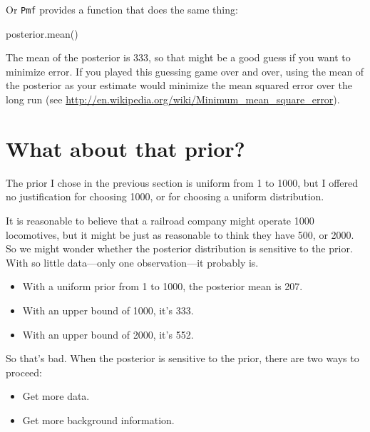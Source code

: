\documentclass[12pt]{book}
\theoremstyle{exercise}
\begin{document}
Or {\tt Pmf} provides a function that does the same thing:

\begin{code}
posterior.mean()
\end{code}

The mean of the posterior is 333, so that might be a good guess if you want to minimize error.  
If you played this guessing game over and over, using the mean of the posterior as your estimate would minimize the mean squared error over the long run (see \url{http://en.wikipedia.org/wiki/Minimum_mean_square_error}).



\section{What about that prior?}

The prior I chose in the previous section is uniform from 1 to 1000, but I offered no justification for choosing 1000, or for choosing a uniform
distribution.


It is reasonable to believe that a railroad company might operate 1000 locomotives, but it might be just as reasonable to think they have 500, or 2000.
So we might wonder whether the posterior distribution is sensitive to the prior.  
With so little data---only one observation---it probably is.

\begin{itemize}

\item With a uniform prior from 1 to 1000, the posterior mean is 207.

\item With an upper bound of 1000, it's 333.

\item With an upper bound of 2000, it's 552.

\end{itemize}

So that's bad.  
When the posterior is sensitive to the prior, there are two ways to proceed:

\begin{itemize}

\item Get more data.

\item Get more background information.

\end{itemize}
\end{document}

